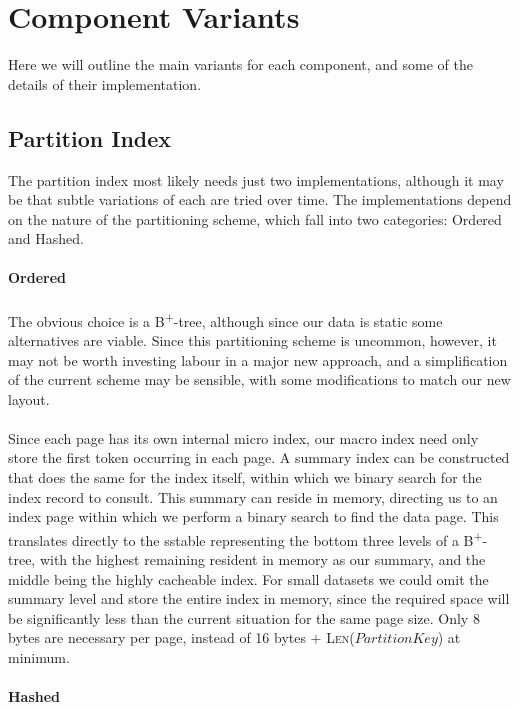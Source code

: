 \documentclass[fleqn]{article}
\begin{document}
\section{Component Variants}
Here we will outline the main variants for each component, and some of the details of their implementation.

\subsection{Partition Index}
The partition index most likely needs just two implementations, although it may be that subtle variations
of each are tried over time. The implementations depend on the nature of the partitioning scheme, which
fall into two categories: Ordered and Hashed.
\paragraph{Ordered}
\paragraph{}
    The obvious choice is a B\textsuperscript{+}-tree, although since our data is static some alternatives are viable.
    Since this partitioning scheme is uncommon, however, it may not be worth investing labour in a major new 
    approach, and a simplification of the current scheme may be sensible, with some modifications to match our
    new layout.
    \\\\
    Since each page has its own internal micro index, our macro index need only store the first token occurring 
    in each page. A summary index can be constructed that does the same for the index itself, within which
    we binary search for the index record to consult. This summary can reside in memory, directing us to an 
    index page within which we perform a binary search to find the data page. 
    This translates directly to the sstable representing the 
    bottom three levels of a B\textsuperscript{+}-tree, with the highest remaining resident in memory as our 
    summary, and the middle being the highly cacheable index. For small datasets we could omit the summary level
    and store the entire index in memory, since the required space will be significantly less than the current
    situation for the same page size. Only 8 bytes are necessary per page, instead of 16 bytes 
    + \textsc{Len}($PartitionKey$) at minimum.
    
\paragraph{Hashed}
\end{document}
